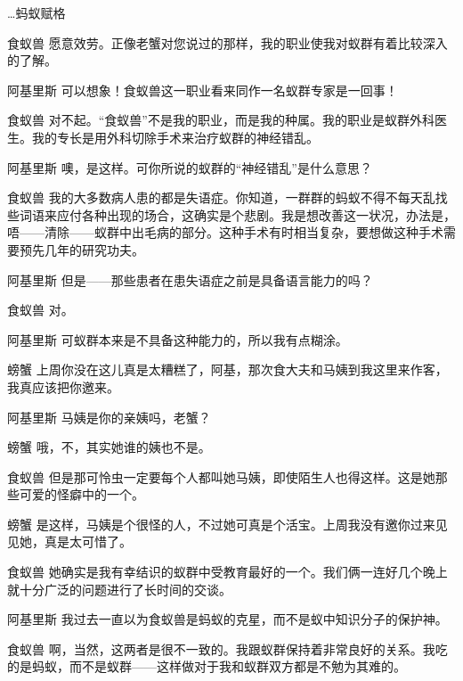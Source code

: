 \begin{dialog}{…蚂蚁赋格}
\begin{dialogue}
\item[食蚁兽]愿意效劳。正像老蟹对您说过的那样，我的职业使我对蚁群有着比较深入的了解。

\item[阿基里斯]可以想象！食蚁兽这一职业看来同作一名蚁群专家是一回事！

\item[食蚁兽]对不起。“食蚁兽”不是我的职业，而是我的种属。我的职业是蚁群外科医生。我的专长是用外科切除手术来治疗蚁群的神经错乱。

\item[阿基里斯]噢，是这样。可你所说的蚁群的“神经错乱”是什么意思？

\item[食蚁兽]我的大多数病人患的都是失语症。你知道，一群群的蚂蚁不得不每天乱找些词语来应付各种出现的场合，这确实是个悲剧。我是想改善这一状况，办法是，唔——清除——蚁群中出毛病的部分。这种手术有时相当复杂，要想做这种手术需要预先几年的研究功夫。

\item[阿基里斯]但是——那些患者在患失语症之前是具备语言能力的吗？

\item[食蚁兽]对。

\item[阿基里斯]可蚁群本来是不具备这种能力的，所以我有点糊涂。

\item[螃蟹]上周你没在这儿真是太糟糕了，阿基，那次食大夫和马姨到我这里来作客，我真应该把你邀来。

\item[阿基里斯]马姨是你的亲姨吗，老蟹？

\item[螃蟹]哦，不，其实她谁的姨也不是。

\item[食蚁兽]但是那可怜虫一定要每个人都叫她马姨，即使陌生人也得这样。这是她那些可爱的怪癖中的一个。

\item[螃蟹]是这样，马姨是个很怪的人，不过她可真是个活宝。上周我没有邀你过来见见她，真是太可惜了。

\item[食蚁兽]她确实是我有幸结识的蚁群中受教育最好的一个。我们俩一连好几个晚上就十分广泛的问题进行了长时间的交谈。

\item[阿基里斯]我过去一直以为食蚁兽是蚂蚁的克星，而不是蚁中知识分子的保护神。

\item[食蚁兽]啊，当然，这两者是很不一致的。我跟蚁群保持着非常良好的关系。我吃的是蚂蚁，而不是蚁群——这样做对于我和蚁群双方都是不勉为其难的。


\end{dialogue}
\end{dialog}

